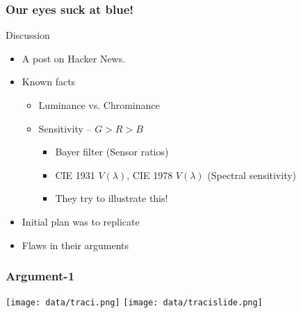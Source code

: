 \documentclass[presentation]{beamer}
\begin{document}
\begin{frame}
\frametitle{Our eyes suck at blue!}
\label{sec-2_3}
\begin{block}{Discussion}
\label{sec-2_3_1}

\begin{itemize}
\item A post on Hacker News.
\item Known facts

\begin{itemize}
\item Luminance vs. Chrominance
\item Sensitivity -- $G > R > B$

\begin{itemize}
\item Bayer filter (Sensor ratios)
\item CIE 1931 $V(\lambda)$, CIE 1978 $V(\lambda)$ (Spectral sensitivity)
\item They try to illustrate this!
\end{itemize}

\end{itemize}

\item Initial plan was to replicate
\item Flaws in their arguments
\end{itemize}
\end{block}
\end{frame}
\begin{frame}
\frametitle{Argument-1}
\label{sec-2_4}

      \begin{center}
        \texttt{[image: data/traci.png]}
        \texttt{[image: data/tracislide.png]}  
      \end{center}
\end{frame}
\end{document}
